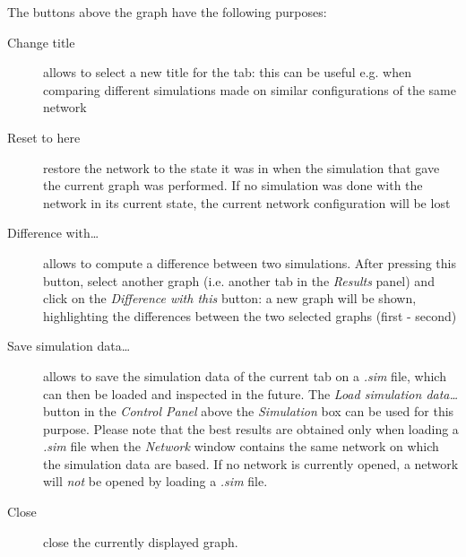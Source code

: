\documentclass{article}
\begin{document}
The buttons above the graph have the following purposes:
\begin{description}
  \item[Change title] allows to select a new title for the tab: this can be useful e.g. when comparing different
simulations made on similar configurations of the same network
  \item[Reset to here] restore the network to the state it was in when the simulation that gave the current graph was performed.
If no simulation was done with the network in its current state, the current network configuration will be lost
  \item[Difference with\dots] allows to compute a difference between two simulations. After pressing this button, select another
graph (i.e. another tab in the \emph{Results} panel) and click on the \emph{Difference with this} button: a new graph will be shown,
highlighting the differences between the two selected graphs (first - second)
  \item[Save simulation data\dots] allows to save
the simulation data of the current tab on a \emph{.sim} file, which can then be loaded and inspected in the future.
The \emph{Load simulation data\dots} button in the \emph{Control Panel} above the \emph{Simulation} box can be used for this purpose.
Please note that the best results are obtained only when loading a \emph{.sim} file when the \emph{Network} window contains the same network
on which the simulation data are based. If no network is currently opened, a network will \emph{not} be opened by loading a \emph{.sim} file.
  \item[Close] close the currently displayed graph.
\end{description}
\end{document}
